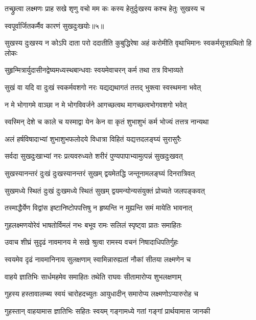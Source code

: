 \twolineshloka
{तच्छ्रुत्वा लक्ष्मणः प्राह सखे शृणु वचो मम}
{कः कस्य हेतुर्दुःखस्य कश्च हेतुः सुखस्य च} %

{स्वपूर्वार्जितकर्मैव कारणं सुखदुःखयोः॥५॥} %


\fourlineindentedshloka
{सुखस्य दुःखस्य न कोऽपि दाता}
{परो ददातीति कुबुद्धिरेषा}
{अहं करोमीति वृथाभिमानः}
{स्वकर्मसूत्रग्रथितो हि लोकः} %

\twolineshloka
{सुहृन्मित्रार्युदासीनद्वेष्यमध्यस्थबान्धवाः}
{स्वयमेवाचरन् कर्म तथा तत्र विभाव्यते} %

\twolineshloka
{सुखं वा यदि वा दुःखं स्वकर्मवशगो नरः}
{यद्यद्यथागतं तत्तद् भुक्त्वा स्वस्थमना भवेत्} %

\twolineshloka
{न मे भोगागमे वाञ्छा न मे भोगविवर्जने}
{आगच्छत्वथ मागच्छत्वभोगवशगो भवेत्} %

\twolineshloka
{स्वस्मिन् देशे च काले च यस्माद्वा येन केन वा}
{कृतं शुभाशुभं कर्म भोज्यं तत्तत्र नान्यथा} %

\twolineshloka
{अलं हर्षविषादाभ्यां शुभाशुभफलोदये}
{विधात्रा विहितं यद्यत्तदलङ्घ्यं सुरासुरैः} %

\twolineshloka
{सर्वदा सुखदुःखाभ्यां नरः प्रत्यवरुध्यते}
{शरीरं पुण्यपापाभ्यामुत्पन्नं सुखदुःखवत्} %

\twolineshloka
{सुखस्यानन्तरं दुःखं दुःखस्यानन्तरं सुखम्}
{द्वयमेतद्धि जन्तूनामलङ्घ्यं दिनरात्रिवत्} %

\twolineshloka
{सुखमध्ये स्थितं दुःखं दुःखमध्ये स्थितं सुखम्}
{द्वयमन्योन्यसंयुक्तं प्रोच्यते जलपङ्कवत्} %

\twolineshloka
{तस्माद्धैर्येण विद्वांस इष्टानिष्टोपपत्तिषु}
{न हृष्यन्ति न मुह्यन्ति समं मायेति भावनात्} %

\twolineshloka
{गुहलक्ष्मणयोरेवं भाषतोर्विमलं नभः}
{बभूव रामः सलिलं स्पृष्ट्वा प्रातः समाहितः} %

\twolineshloka
{उवाच शीघ्रं सुदृढं नावमानय मे सखे}
{श्रुत्वा रामस्य वचनं निषादाधिपतिर्गुहः} %

\twolineshloka
{स्वयमेव दृढं नावमानिनाय सुलक्षणाम्}
{स्वामिन्नारुह्यतां नौकां सीतया लक्ष्मणेन च} %

\twolineshloka
{वाहये ज्ञातिभिः सार्धमहमेव समाहितः}
{तथेति राघवः सीतामारोप्य शुभलक्षणाम्} %

\twolineshloka
{गुहस्य हस्तावालम्ब्य स्वयं चारोहदच्युतः}
{आयुधादीन् समारोप्य लक्ष्मणोऽप्यारुरोह च} %

\twolineshloka
{गुहस्तान् वाहयामास ज्ञातिभिः सहितः स्वयम्}
{गङ्गामध्ये गतां गङ्गां प्रार्थयामास जानकी} %

